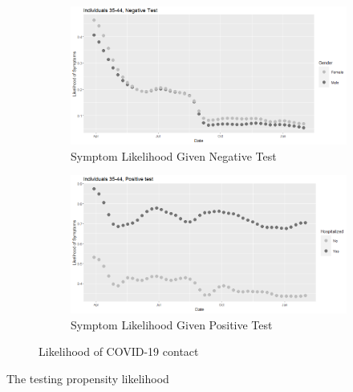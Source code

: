 \documentclass[11pt]{amsart}
\numberwithin{equation}{section}
\theoremstyle{plain}
\begin{document}
\begin{figure}[!th]
\centering
\begin{subfigure}{.5\textwidth}
 \centering
 \includegraphics[width=.9\linewidth]{../figs/tvprop_symptom_alt_fig1.png}
 \caption{Symptom Likelihood Given Negative Test}
 \label{fig:symptomlik1_model2}
\end{subfigure}%
\begin{subfigure}{.5\textwidth}
 \centering
\includegraphics[width=.9\linewidth]{../figs/tvprop_symptom_alt_fig2.png}
 \caption{Symptom Likelihood Given Positive Test}
 \label{fig:symptomlik2_model2}
\end{subfigure}
\caption{Likelihood of COVID-19 contact}
\label{fig:symptomlik}
\end{figure}

The testing propensity likelihood
\end{document}
